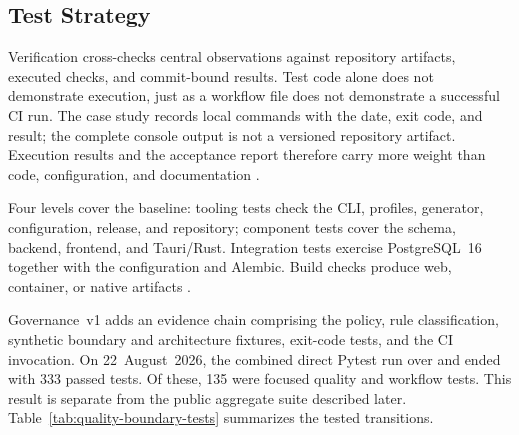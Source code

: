 \subsection{Test Strategy}
\label{subsec:teststrategie}

Verification cross-checks central observations against repository artifacts,
executed checks, and commit-bound results. Test code alone does not demonstrate
execution, just as a workflow file does not demonstrate a successful CI run.
The case study records local commands with the date, exit code, and result; the
complete console output is not a versioned repository artifact.
Execution results and the acceptance report therefore carry more weight than
code, configuration, and documentation
\parencite{runeson2009case-study,iso25010-2023}.

Four levels cover the baseline: tooling tests check the CLI, profiles,
generator, configuration, release, and repository; component tests cover the
schema, backend, frontend, and Tauri/Rust. Integration tests exercise
PostgreSQL~16 together with the configuration and Alembic. Build checks
produce web, container, or native artifacts \parencite{kleiveist2026ci}.

Governance~v1 adds an evidence chain comprising the policy, rule
classification, synthetic boundary and architecture fixtures, exit-code
tests, and the CI invocation. On 22~August~2026, the combined direct Pytest run
over  and  ended with 333 passed
tests. Of these, 135 were focused quality and workflow tests. This result is
separate from the public aggregate suite described later.
Table~\ref{tab:quality-boundary-tests} summarizes the tested transitions.

